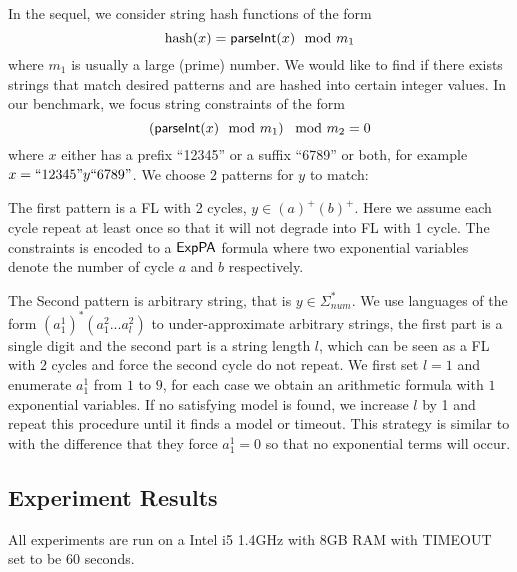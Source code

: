 {%

In the sequel, we consider string hash functions of the form  
\begin{equation}
    \text{hash}(x)= \textsf{parseInt}(x) \mod m_1  \notag
\end{equation}
where $m_1$ is usually a large (prime) number. We would like to find if there exists strings that match desired patterns and are hashed into certain integer values. In our benchmark, we focus string constraints of the form
\begin{equation}
    \left( \textsf{parseInt}(x) \mod m_1\right) \mod m_2 = 0   \notag
\end{equation}
where $x$ either has a prefix ``12345'' or a suffix ``6789'' or both, for example $x=``12345"y``6789"$. We choose 2 patterns for $y$ to match: 

The first pattern is a FL with 2 cycles, $y \in (a)^+(b)^+$. Here we assume each cycle repeat at least once so that it will not degrade into FL with 1 cycle. The constraints is encoded to a ${\sf ExpPA}$ formula where two exponential variables denote the number of cycle $a$ and $b$ respectively.

The Second pattern is arbitrary string, that is $y\in \Sigma_{num}^*$. We use languages of the form $(a^1_1)^* (a^2_1...a^2_l)$ to under-approximate arbitrary strings, the first part is a single digit and the second part is a string length $l$, which can be seen as a FL with 2 cycles and force the second cycle do not repeat. We first set $l=1$ and enumerate $a^1_1$ from $1$ to $9$, for each case we obtain an arithmetic formula with $1$ exponential variables. If no satisfying model is found, we increase $l$ by 1 and repeat this procedure until it finds a model or timeout. This strategy is similar to \cite{Abdulla2020} with the difference that they force $a^1_1=0$ so that no exponential terms will occur.
}



\subsection{Experiment Results}

All experiments are run on a Intel i5 1.4GHz with 8GB RAM with TIMEOUT set to be 60 seconds. 

